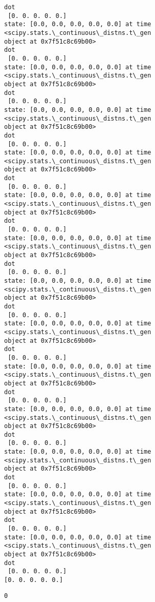\documentclass[11pt]{article}
\makeatletter
\newcommand{\boxspacing}{\kern\kvtcb@left@rule\kern\kvtcb@boxsep}
\newcommand{\prompt}[4]{
        \ttfamily\llap{{\color{#2}[#3]:\hspace{3pt}#4}}\vspace{-\baselineskip}
    }
\makeatother
\begin{document}
\begin{Verbatim}[commandchars=\\\{\}]
dot
 [0. 0. 0. 0. 0.]
state: [0.0, 0.0, 0.0, 0.0, 0.0] at time <scipy.stats.\_continuous\_distns.t\_gen
object at 0x7f51c8c69b00>
dot
 [0. 0. 0. 0. 0.]
state: [0.0, 0.0, 0.0, 0.0, 0.0] at time <scipy.stats.\_continuous\_distns.t\_gen
object at 0x7f51c8c69b00>
dot
 [0. 0. 0. 0. 0.]
state: [0.0, 0.0, 0.0, 0.0, 0.0] at time <scipy.stats.\_continuous\_distns.t\_gen
object at 0x7f51c8c69b00>
dot
 [0. 0. 0. 0. 0.]
state: [0.0, 0.0, 0.0, 0.0, 0.0] at time <scipy.stats.\_continuous\_distns.t\_gen
object at 0x7f51c8c69b00>
dot
 [0. 0. 0. 0. 0.]
state: [0.0, 0.0, 0.0, 0.0, 0.0] at time <scipy.stats.\_continuous\_distns.t\_gen
object at 0x7f51c8c69b00>
dot
 [0. 0. 0. 0. 0.]
state: [0.0, 0.0, 0.0, 0.0, 0.0] at time <scipy.stats.\_continuous\_distns.t\_gen
object at 0x7f51c8c69b00>
dot
 [0. 0. 0. 0. 0.]
state: [0.0, 0.0, 0.0, 0.0, 0.0] at time <scipy.stats.\_continuous\_distns.t\_gen
object at 0x7f51c8c69b00>
dot
 [0. 0. 0. 0. 0.]
state: [0.0, 0.0, 0.0, 0.0, 0.0] at time <scipy.stats.\_continuous\_distns.t\_gen
object at 0x7f51c8c69b00>
dot
 [0. 0. 0. 0. 0.]
state: [0.0, 0.0, 0.0, 0.0, 0.0] at time <scipy.stats.\_continuous\_distns.t\_gen
object at 0x7f51c8c69b00>
dot
 [0. 0. 0. 0. 0.]
state: [0.0, 0.0, 0.0, 0.0, 0.0] at time <scipy.stats.\_continuous\_distns.t\_gen
object at 0x7f51c8c69b00>
dot
 [0. 0. 0. 0. 0.]
state: [0.0, 0.0, 0.0, 0.0, 0.0] at time <scipy.stats.\_continuous\_distns.t\_gen
object at 0x7f51c8c69b00>
dot
 [0. 0. 0. 0. 0.]
state: [0.0, 0.0, 0.0, 0.0, 0.0] at time <scipy.stats.\_continuous\_distns.t\_gen
object at 0x7f51c8c69b00>
dot
 [0. 0. 0. 0. 0.]
state: [0.0, 0.0, 0.0, 0.0, 0.0] at time <scipy.stats.\_continuous\_distns.t\_gen
object at 0x7f51c8c69b00>
dot
 [0. 0. 0. 0. 0.]
[0. 0. 0. 0. 0.]
    \end{Verbatim}

            \begin{tcolorbox}[breakable, size=fbox, boxrule=.5pt, pad at break*=1mm, opacityfill=0]
\prompt{Out}{outcolor}{123}{\boxspacing}
\begin{Verbatim}[commandchars=\\\{\}]
0
\end{Verbatim}
\end{tcolorbox}
        
\end{document}
